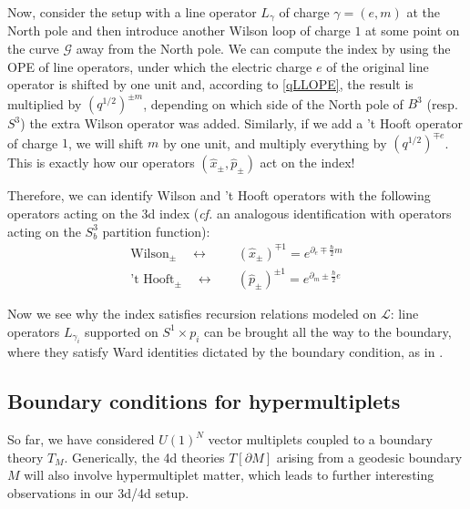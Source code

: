 \documentclass[11pt,letterpaper]{article}
\numberwithin{equation}{section}
\newcommand{\pd}{\partial}
\newcommand{\CG}{\mathcal{G}}
\newcommand{\CL}{\mathcal{L}}
\begin{document}
Now, consider the setup with a line operator $L_{\gamma}$ of charge $\gamma = (e,m)$ at the North pole
and then introduce another Wilson loop of charge $1$ at some point on the curve $\CG$ away from the North pole.
We can compute the index by using the OPE of line operators, under which the electric charge $e$
of the original line operator is shifted by one unit and, according to \eqref{qLLOPE},
the result is multiplied by $(q^{1/2})^{\pm m}$, depending on which side of the North pole of $B^3$ (resp. $S^3$)
the extra Wilson operator was added.
Similarly, if we add a 't Hooft operator of charge $1$, we will shift $m$ by one unit, and multiply  everything by $(q^{1/2})^{\mp e}$.
This is exactly how our operators $(\hat{x}_{\pm}, \hat{p}_{\pm})$ act on the index!

Therefore, we can identify Wilson and 't Hooft operators with the following operators acting
on the 3d index ({\it cf.} an analogous identification \cite{DGG} with operators acting on the $S^3_b$ partition function):
\begin{align}
\text{Wilson}_{\pm} \quad \longleftrightarrow \quad & (\hat{x}_{\pm})^{\mp 1} = e^{\partial_e \mp \tfrac{\hbar}{2} m} \\
\text{'t Hooft}_{\pm} \quad \longleftrightarrow \quad & (\hat{p}_{\pm})^{\pm 1} = e^{\partial_m \pm \tfrac{\hbar}{2} e}
\end{align}

Now we see why the index satisfies recursion relations modeled on $\CL$: line operators $L_{\gamma_i}$ supported on $S^1 \times p_i$
can be brought all the way to the boundary, where they satisfy Ward identities dictated by the boundary condition, as in \cite{DGG}.




\subsection{Boundary conditions for hypermultiplets}

So far, we have considered $U(1)^N$ vector multiplets coupled to a boundary theory $T_M$. Generically, the 4d theories $T[\pd M]$ arising from a geodesic boundary $M$ will also involve hypermultiplet matter, which leads to further interesting observations in our 3d/4d setup.
\end{document}
